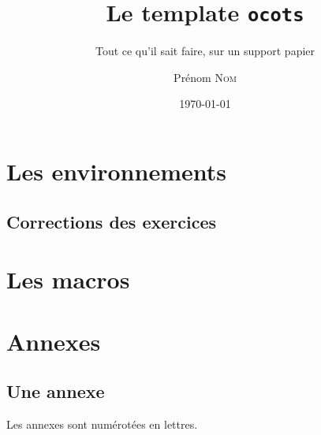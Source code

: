 \documentclass[11pt,twoside]{ocots-book}
\title{Le template \texttt{ocots}}
\subtitle{Tout ce qu'il sait faire, sur un support papier}
\author{Prénom \textsc{Nom}}
\date{\today}
\begin{document}
\dominitoc%

\frontmatter%
\maketitle
\tableofcontents

\mainmatter%

\part{Les environnements}%
\label{part:env}

\ocotscollectsolutions%





\chapter{Corrections des exercices}%
\label{chap:solutions}
\ocotsprintsolutions%

\part{Les macros}%
\label{part:macros}




\part{Annexes}%
\label{part:appendix}

\begin{appendix}
    \chapter{Une annexe}%
    \label{chap:appendix}
    \minitoc%

    Les annexes sont numérotées en lettres.
\end{appendix}

\backmatter%
\printindex%
\end{document}
